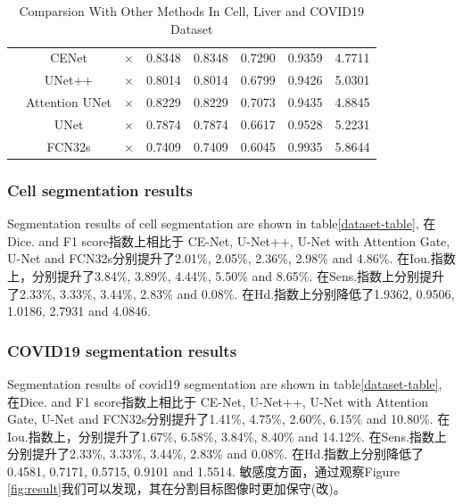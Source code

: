 \documentclass{ieeeaccess}
\begin{document}
\begin{table}[htbp]
\begin{center}
\begin{tabular}{cccccccc}
                            &  CENet & $\times$ & 0.8348 & 0.8348 & 0.7290 & 0.9359 & 4.7711\\
                            &  UNet++ & $\times$ & 0.8014 & 0.8014 & 0.6799 & 0.9426 & 5.0301\\
                            &  Attention UNet & $\times$ & 0.8229 & 0.8229 & 0.7073 & 0.9435 & 4.8845\\
                            &  UNet  & $\times$ & 0.7874 & 0.7874 & 0.6617 & 0.9528 & 5.2231\\
                            &  FCN32s & $\times$ & 0.7409 & 0.7409 & 0.6045 & 0.9935 & 5.8644\\
    \bottomrule    
      \end{tabular}
      \caption{Comparsion With Other Methods In Cell\cite{dsb2018}, Liver\cite{liver} and COVID19\cite{covid19_2} Dataset}
    \end{center}
  \vspace{-4mm}
  \end{table}
  \subsubsection{Cell segmentation results}
  
  
  Segmentation results of cell segmentation are shown in table\ref{dataset-table}, 在Dice. and F1 score指数上相比于
  CE-Net, U-Net++, U-Net with Attention Gate, U-Net and FCN32s分别提升了2.01\%, 2.05\%, 2.36\%, 2.98\% and 4.86\%.
  在Iou.指数上，分别提升了3.84\%, 3.89\%, 4.44\%, 5.50\% and 8.65\%. 在Sens.指数上分别提升了2.33\%, 3.33\%, 3.44\%, 
  2.83\% and 0.08\%. 在Hd.指数上分别降低了1.9362, 0.9506, 1.0186, 2.7931 and 4.0846.
  
    \subsubsection{COVID19 segmentation results}
    Segmentation results of covid19 segmentation are shown in table\ref{dataset-table}, 在Dice. and F1 score指数上相比于
    CE-Net, U-Net++, U-Net with Attention Gate, U-Net and FCN32s分别提升了1.41\%, 4.75\%, 2.60\%, 6.15\% and 10.80\%.
    在Iou.指数上，分别提升了1.67\%, 6.58\%, 3.84\%, 8.40\% and 14.12\%. 在Sens.指数上分别提升了2.33\%, 3.33\%, 3.44\%, 2.83\% and 0.08\%.  在Hd.指数上分别降低了0.4581, 0.7171, 0.5715, 0.9101 and 1.5514. 敏感度方面，通过观察Figure 
  \ref{fig:result}我们可以发现，其在分割目标图像时更加保守(改)。
  
\end{document}
